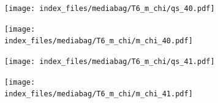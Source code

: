 \documentclass[
  11pt,
  letterpaper,
]{scrreprt}
\begin{document}
\begin{figure}

\begin{minipage}{0.50\linewidth}

\begin{figure}[H]

{\centering \texttt{[image: index\_files/mediabag/T6\_m\_chi/qs\_40.pdf]}

}


\end{figure}%

\end{minipage}%
%
\begin{minipage}{0.50\linewidth}

\begin{figure}[H]

{\centering \texttt{[image: index\_files/mediabag/T6\_m\_chi/m\_chi\_40.pdf]}

}


\end{figure}%

\end{minipage}%

\end{figure}%

\begin{figure}

\begin{minipage}{0.50\linewidth}

\begin{figure}[H]

{\centering \texttt{[image: index\_files/mediabag/T6\_m\_chi/qs\_41.pdf]}

}


\end{figure}%

\end{minipage}%
%
\begin{minipage}{0.50\linewidth}

\begin{figure}[H]

{\centering \texttt{[image: index\_files/mediabag/T6\_m\_chi/m\_chi\_41.pdf]}

}


\end{figure}%

\end{minipage}%

\end{figure}%
\end{document}
